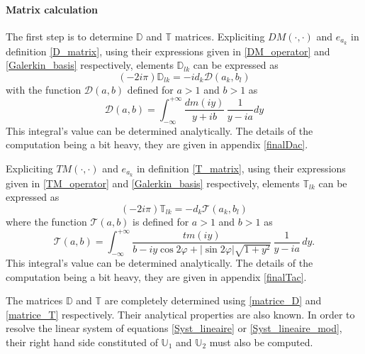 \paragraph{Matrix calculation}

The first step is to determine $\mathbb{D}$ and $\mathbb{T}$ matrices.
Expliciting $DM(\cdot,\cdot)$ and $e_{a_k}$ in definition \eqref{D_matrix}, using their expressions given in \eqref{DM_operator} and \eqref{Galerkin_basis} respectively, elements $\mathbb{D}_{lk}$ can be expressed as
\begin{equation}
\label{matrice_D}
(-2i\pi) \mathbb{D}_{lk} =  -i d_k \mathcal{D}(a_k,b_l)
\end{equation}
with the function $\mathcal{D}(a,b)$ defined for $a>1$ and $b>1$ as
\begin{equation}
\label{ldbis}
\mathcal{D}(a,b) = \int_{-\infty}^{+\infty} \dfrac{dm(iy)}{y + ib} \, \dfrac{1}{y -ia} dy 
\end{equation}
This integral's value can be determined analytically. The details of the computation being a bit heavy, they are given in appendix \ref{finalDac}.

Expliciting $TM(\cdot,\cdot)$ and $e_{a_k}$ in definition \eqref{T_matrix}, using their expressions given in \eqref{TM_operator} and \eqref{Galerkin_basis} respectively, elements $\mathbb{T}_{lk}$ can be expressed as
\begin{equation}
\label{matrice_T}
(-2i\pi) \mathbb{T}_{lk} =  - d_k \mathcal{T}(a_k,b_l)
\end{equation}
where the function $\mathcal{T}(a,b)$ is defined for $a>1$ and $b>1$ as
\begin{equation}
\label{ltbis}
\mathcal{T}(a,b) = \int_{-\infty}^{+\infty} \dfrac{tm(iy)}{ b - iy \cos 2\varphi  + |\sin 2\varphi| \sqrt{1+y^2}} \, \dfrac{1}{y -i a} \, dy . 
\end{equation}
This integral's value can be determined analytically. The details of the computation being a bit heavy, they are given in appendix \ref{finalTac}.

The matrices $\mathbb{D}$ and $\mathbb{T}$ are completely determined using \eqref{matrice_D} and \eqref{matrice_T} respectively. Their analytical properties are also known. In order to resolve the linear system of equations \eqref{Syst_lineaire} or \eqref{Syst_lineaire_mod},  their right hand side constituted of $\mathbb{U}_1$ and $\mathbb{U}_2$ must also be computed.

